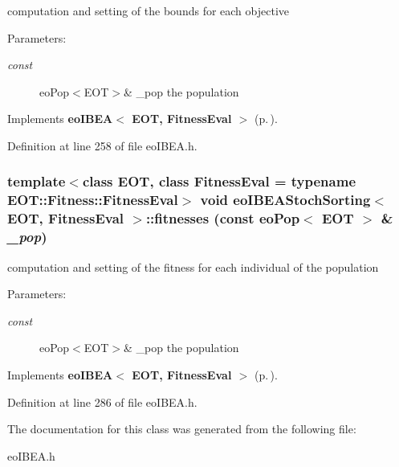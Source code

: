 computation and setting of the bounds for each objective 

\begin{Desc}
\item[Parameters:]
\begin{description}
\item[{\em const}]eo\-Pop$<$EOT$>$\& \_\-pop the population \end{description}
\end{Desc}


Implements {\bf eo\-IBEA$<$ EOT, Fitness\-Eval $>$} {\rm (p.\,\pageref{classeoIBEA})}.

Definition at line 258 of file eo\-IBEA.h.
\subsubsection{\setlength{\rightskip}{0pt plus 5cm}template$<$class EOT, class Fitness\-Eval = typename EOT::Fitness::Fitness\-Eval$>$ void {\bf eo\-IBEAStoch\-Sorting}$<$ EOT, Fitness\-Eval $>$::fitnesses (const {\bf eo\-Pop}$<$ EOT $>$ \& {\em \_\-pop})\hspace{0.3cm}{\tt  [inline, private, virtual]}}\label{classeoIBEAStochSorting_0d099b5a341791b35db98b350cdbc83f}


computation and setting of the fitness for each individual of the population 

\begin{Desc}
\item[Parameters:]
\begin{description}
\item[{\em const}]eo\-Pop$<$EOT$>$\& \_\-pop the population \end{description}
\end{Desc}


Implements {\bf eo\-IBEA$<$ EOT, Fitness\-Eval $>$} {\rm (p.\,\pageref{classeoIBEA})}.

Definition at line 286 of file eo\-IBEA.h.

The documentation for this class was generated from the following file:\begin{CompactItemize}
\item 
eo\-IBEA.h\end{CompactItemize}
